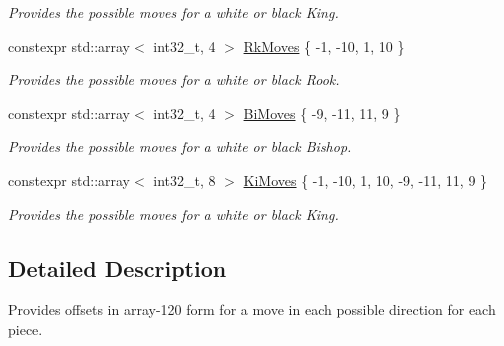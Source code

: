 \begin{DoxyCompactItemize}
\begin{DoxyCompactList}\small\item\em Provides the possible moves for a white or black King. \end{DoxyCompactList}\item 
\mbox{\label{namespaceAttack_a820d1cf837df102dc24ac62b3c903d45}} 
constexpr std\+::array$<$ int32\+\_\+t, 4 $>$ \mbox{\hyperlink{namespaceAttack_a820d1cf837df102dc24ac62b3c903d45}{Rk\+Moves}} \{ -\/1, -\/10, 1, 10 \}
\begin{DoxyCompactList}\small\item\em Provides the possible moves for a white or black Rook. \end{DoxyCompactList}\item 
\mbox{\label{namespaceAttack_a69a28344c45a39f51b1196a6d78a7cf5}} 
constexpr std\+::array$<$ int32\+\_\+t, 4 $>$ \mbox{\hyperlink{namespaceAttack_a69a28344c45a39f51b1196a6d78a7cf5}{Bi\+Moves}} \{ -\/9, -\/11, 11, 9 \}
\begin{DoxyCompactList}\small\item\em Provides the possible moves for a white or black Bishop. \end{DoxyCompactList}\item 
\mbox{\label{namespaceAttack_a0614d021c90c3ff6d470c1c13a1f0ad9}} 
constexpr std\+::array$<$ int32\+\_\+t, 8 $>$ \mbox{\hyperlink{namespaceAttack_a0614d021c90c3ff6d470c1c13a1f0ad9}{Ki\+Moves}} \{ -\/1, -\/10, 1, 10, -\/9, -\/11, 11, 9 \}
\begin{DoxyCompactList}\small\item\em Provides the possible moves for a white or black King. \end{DoxyCompactList}\end{DoxyCompactItemize}


\subsection{Detailed Description}
Provides offsets in array-\/120 form for a move in each possible direction for each piece. 